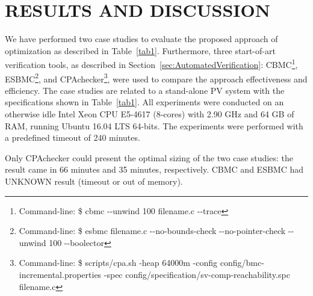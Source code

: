 \documentclass[10pt,conference]{IEEEtran}
\begin{document}
\section{RESULTS AND DISCUSSION}
We have performed two case studies to evaluate the proposed approach of optimization as described in Table~\ref{tab1}. Furthermore, three start-of-art verification tools, as described in Section~\ref{sec:AutomatedVerification}: CBMC\footnote{Command-line: \$ cbmc -\phantom{}-unwind 100 filename.c -\phantom{}-trace}, ESBMC\footnote{Command-line: \$ esbmc filename.c -\phantom{}-no-bounds-check -\phantom{}-no-pointer-check -\phantom{}-unwind 100 -\phantom{}-boolector}, %
and CPAchecker\footnote{Command-line: \$ scripts/cpa.sh -heap 64000m -config config/bmc-incremental.properties -spec config/specification/sv-comp-reachability.spc filename.c}, were used to compare the approach effectiveness and efficiency. The case studies are related to a stand-alone PV system with the specifications shown in Table~\ref{tab1}. All experiments were conducted on an otherwise idle Intel Xeon CPU E5-4617 (8-cores) with 2.90 GHz and 64 GB of RAM, running Ubuntu 16.04 LTS 64-bits. The experiments were performed with a predefined timeout of 240 minutes.

Only CPAchecker could present the optimal sizing of the two case studies: the result came in 66 minutes and 35 minutes, respectively. %
CBMC and ESBMC had UNKNOWN result (timeout or out of memory).
\end{document}
